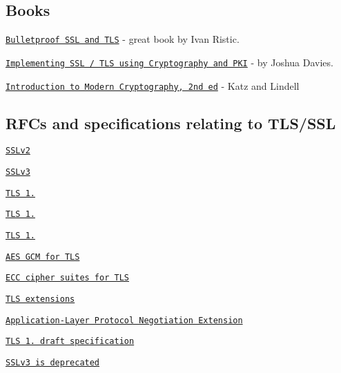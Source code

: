\subsection*{Books}


\begin{DoxyItemize}
\item \href{http://www.amazon.com/Bulletproof-SSL-TLS-Understanding-Applications/dp/1907117040/}{\tt Bulletproof S\+SL and T\+LS} -\/ great book by Ivan Ristic.
\item \href{http://www.amazon.com/Implementing-SSL-TLS-Using-Cryptography/dp/0470920416/}{\tt Implementing S\+SL / T\+LS using Cryptography and P\+KI} -\/ by Joshua Davies.
\item \href{http://www.amazon.com/Introduction-Cryptography-Chapman-Network-Security/dp/1466570261/}{\tt Introduction to Modern Cryptography, 2nd ed} -\/ Katz and Lindell
\end{DoxyItemize}

\subsection*{R\+F\+Cs and specifications relating to T\+L\+S/\+S\+SL}


\begin{DoxyItemize}
\item \href{http://www-archive.mozilla.org/projects/security/pki/nss/ssl/draft02.html}{\tt S\+S\+Lv2}
\item \href{https://tools.ietf.org/html/rfc6101}{\tt S\+S\+Lv3}
\item \href{https://tools.ietf.org/html/rfc2246}{\tt T\+LS 1.}
\item \href{https://tools.ietf.org/html/rfc4346}{\tt T\+LS 1.}
\item \href{https://tools.ietf.org/html/rfc5246}{\tt T\+LS 1.}
\item \href{https://tools.ietf.org/html/rfc5288}{\tt A\+ES G\+CM for T\+LS}
\item \href{https://tools.ietf.org/html/rfc4492}{\tt E\+CC cipher suites for T\+LS}
\item \href{https://tools.ietf.org/html/rfc6066}{\tt T\+LS extensions}
\item \href{https://tools.ietf.org/html/rfc7301}{\tt Application-\/\+Layer Protocol Negotiation Extension}
\item \href{https://github.com/tlswg/tls13-spec}{\tt T\+LS 1. draft specification}
\item \href{https://tools.ietf.org/html/rfc7568}{\tt S\+S\+Lv3 is deprecated}
\end{DoxyItemize}

